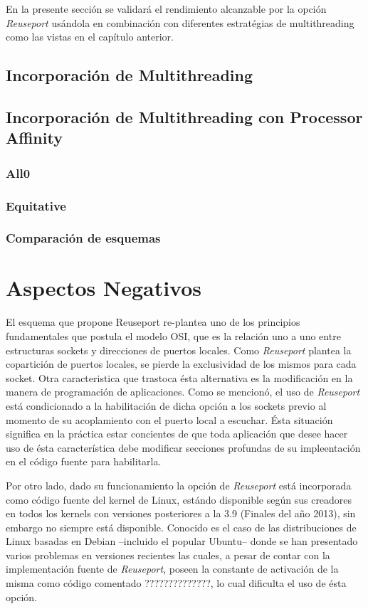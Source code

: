 En la presente sección se validará el rendimiento alcanzable por la opción \emph{Reuseport} usándola en combinación con diferentes estratégias de multithreading como las vistas en el capítulo anterior.

\subsection{Incorporación de Multithreading}

\subsection{Incorporación de Multithreading con Processor Affinity}

\subsubsection{All0}
\subsubsection{Equitative}
\subsubsection{Comparación de esquemas}


\section{Aspectos Negativos}

El esquema que propone Reuseport re-plantea uno de los principios fundamentales que postula el modelo OSI, que es la relación uno a uno entre estructuras sockets y direcciones de puertos locales. Como \emph{Reuseport} plantea la copartición de puertos locales, se pierde la exclusividad de los mismos para cada socket. Otra caracteristica que trastoca ésta alternativa es la modificación en la manera de programación de aplicaciones. Como se mencionó, el uso de \emph{Reuseport} está condicionado a la habilitación de dicha opción a los sockets previo al momento de su acoplamiento con el puerto local a escuchar. Ésta situación significa en la práctica estar concientes de que toda aplicación que desee hacer uso de ésta característica debe modificar secciones profundas de su impleentación en el código fuente para habilitarla.

Por otro lado, dado su funcionamiento la opción de \emph{Reuseport} está incorporada como código fuente del kernel de Linux, estándo disponible según sus creadores en todos los kernels con versiones posteriores a la 3.9 (Finales del año 2013), sin embargo no siempre está disponible. Conocido es el caso de las distribuciones de Linux basadas en Debian --incluido el popular Ubuntu-- donde se han presentado varios problemas en versiones recientes las cuales, a pesar de contar con la implementación fuente de \emph{Reuseport}, poseen la constante de activación de la misma como código comentado ??????????????, lo cual dificulta el uso de ésta opción.

